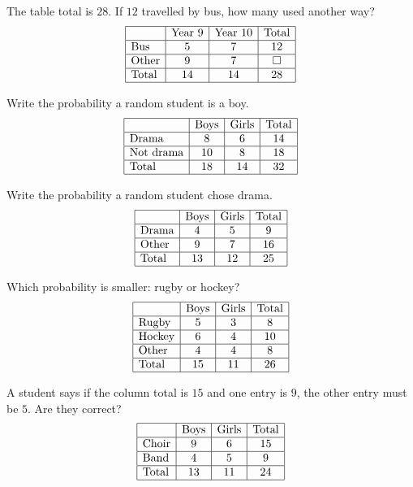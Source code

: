 \documentclass[17pt,a4paper,landscape]{extarticle}
\begin{document}
\begin{tasks}
\task The table total is \mbox{$28$}. If \mbox{$12$} travelled by bus, how many used another way?
\[
\begin{array}{|l|c|c|c|}
\hline
 & \text{Year 9} & \text{Year 10} & \text{Total} \\\hline
\text{Bus} & 5 & 7 & 12 \\\hline
\text{Other} & 9 & 7 & \square \\\hline
\text{Total} & 14 & 14 & 28 \\\hline
\end{array}
\]

\task Write the probability a random student is a boy.
\[
\begin{array}{|l|c|c|c|}
\hline
 & \text{Boys} & \text{Girls} & \text{Total} \\\hline
\text{Drama} & 8 & 6 & 14 \\\hline
\text{Not drama} & 10 & 8 & 18 \\\hline
\text{Total} & 18 & 14 & 32 \\\hline
\end{array}
\]

\task Write the probability a random student chose drama.
\[
\begin{array}{|l|c|c|c|}
\hline
 & \text{Boys} & \text{Girls} & \text{Total} \\\hline
\text{Drama} & 4 & 5 & 9 \\\hline
\text{Other} & 9 & 7 & 16 \\\hline
\text{Total} & 13 & 12 & 25 \\\hline
\end{array}
\]

\task Which probability is smaller: rugby or hockey?
\[
\begin{array}{|l|c|c|c|}
\hline
 & \text{Boys} & \text{Girls} & \text{Total} \\\hline
\text{Rugby} & 5 & 3 & 8 \\\hline
\text{Hockey} & 6 & 4 & 10 \\\hline
\text{Other} & 4 & 4 & 8 \\\hline
\text{Total} & 15 & 11 & 26 \\\hline
\end{array}
\]

\task A student says if the column total is \mbox{$15$} and one entry is \mbox{$9$}, the other entry must be \mbox{$5$}. Are they correct?
\[
\begin{array}{|l|c|c|c|}
\hline
 & \text{Boys} & \text{Girls} & \text{Total} \\\hline
\text{Choir} & 9 & 6 & 15 \\\hline
\text{Band} & 4 & 5 & 9 \\\hline
\text{Total} & 13 & 11 & 24 \\\hline
\end{array}
\]
\end{tasks}
\end{document}
